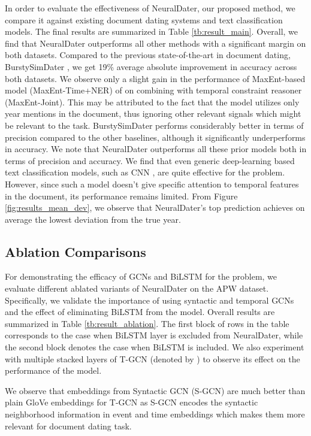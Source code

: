 \documentclass[11pt,a4paper]{article}
\newcommand{\reffig}[1]{Figure \ref{#1}}
\newcommand{\method}{NeuralDater}
\begin{document}
In order to evaluate the effectiveness of \method{}, our proposed method, we compare it against existing document dating systems and text classification models. The final results are summarized in Table \ref{tb:result_main}. Overall, we find that \method{} outperforms all other methods with a significant margin on both datasets. Compared to the previous state-of-the-art in document dating, BurstySimDater  \cite{Kotsakos:2014:BAD:2600428.2609495}, we get 19\% average absolute improvement in accuracy across both datasets. We observe only a slight gain in the performance of MaxEnt-based model (MaxEnt-Time+NER) of \cite{Chambers:2012:LDT:2390524.2390539} on combining with temporal constraint reasoner (MaxEnt-Joint). This may be attributed to the fact that the model utilizes only year mentions in the document, thus ignoring other relevant signals which might be relevant to the task. BurstySimDater performs considerably better in terms of precision compared to the other baselines,  although it significantly underperforms in accuracy. We note that NeuralDater outperforms all these prior models both in terms of precision and accuracy. We find that even generic deep-learning based text classification models, such as CNN \cite{yoon_kim}, are quite effective for the problem. However, since such a model doesn't give specific attention to temporal features in the document, its performance remains limited. From \reffig{fig:results_mean_dev}, we observe that \method{}'s top prediction achieves on average the lowest deviation from the true year.

\subsection{Ablation Comparisons}
\label{sec:ablation}

For demonstrating the efficacy of GCNs and BiLSTM for the problem, we evaluate different ablated variants of \method{} on the APW dataset. Specifically, we validate the importance of using syntactic and temporal GCNs and the effect of eliminating BiLSTM from the model. Overall results are summarized in Table \ref{tb:result_ablation}. The first block of rows in the table corresponds to the case when BiLSTM layer is excluded from \method{}, while the second block denotes the case when BiLSTM is included. We also experiment with multiple stacked layers of T-GCN (denoted by ) to observe its effect on the performance of the model. 

We observe that embeddings from Syntactic GCN (S-GCN) are much better than plain GloVe embeddings for T-GCN as S-GCN encodes the syntactic neighborhood information in event and time embeddings which makes them more relevant for document dating task.
\end{document}
